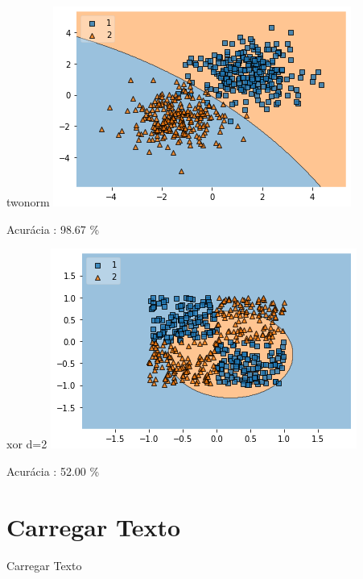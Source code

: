 \documentclass[darkblue]{beamer}
\begin{document}
    \begin{frame}{twonorm}
        \includegraphics[width=\textwidth]{output_79_0.png}
        \centerline{Acurácia  : 98.67 \%}
    \end{frame}
    
    \begin{frame}{xor d=2}
        \includegraphics[width=\textwidth]{output_83_0.png}
        \centerline{Acurácia  : 52.00 \%}
    \end{frame}
    
    \section{Carregar Texto}
    
    \begin{frame}[allowframebreaks]{Carregar Texto}
    	\inputminted{python}{cod04.py}
    \end{frame}
    
\end{document}

